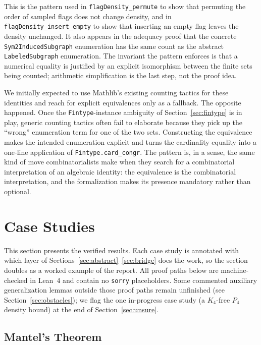 \documentclass{article}
\newcommand{\lean}[1]{\texttt{#1}}
\begin{document}
This is the pattern used in \lean{flagDensity\_permute} to show that
permuting the order of sampled flags does not change density, and in
\lean{flagDensity\_insert\_empty} to show that inserting an empty flag
leaves the density unchanged.  It also appears in the adequacy proof that
the concrete \lean{Sym2InducedSubgraph} enumeration has the same count as
the abstract \lean{LabeledSubgraph} enumeration.  The invariant the pattern
enforces is that a numerical equality is justified by an explicit
isomorphism between the finite sets being counted; arithmetic simplification
is the last step, not the proof idea.

We initially expected to use Mathlib's existing counting tactics for these
identities and reach for explicit equivalences only as a fallback.  The
opposite happened.  Once the \lean{Fintype}-instance ambiguity of
Section~\ref{sec:fintype} is in play, generic counting tactics often fail to
elaborate because they pick up the ``wrong'' enumeration term for one of the
two sets.  Constructing the equivalence makes the intended enumeration
explicit and turns the cardinality equality into a one-line application of
\lean{Fintype.card\_congr}.  The pattern is, in a sense, the same kind of
move combinatorialists make when they search for a combinatorial
interpretation of an algebraic identity: the equivalence is the
combinatorial interpretation, and the formalization makes its presence
mandatory rather than optional.


\section{Case Studies}
\label{sec:results}

This section presents the verified results.  Each case study is annotated
with which layer of Sections~\ref{sec:abstract}--\ref{sec:bridge} does the
work, so the section doubles as a worked example of the report.  All proof
paths below are machine-checked in Lean~4 and contain no \lean{sorry}
placeholders.  Some commented auxiliary generalization lemmas outside those
proof paths remain unfinished (see Section~\ref{sec:obstacles}); we flag the
one in-progress case study (a $K_4$-free $P_4$ density bound) at the end of
Section~\ref{sec:unsure}.

\subsection{Mantel's Theorem}
\end{document}
